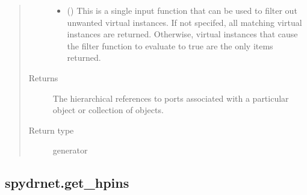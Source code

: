 \documentclass[letterpaper,10pt,english,openany,oneside]{sphinxmanual}
\begin{document}
\begin{fulllineitems}
\begin{quote}
\begin{description}
\begin{itemize}
\item {} 
 () \textendash{} This is a single input function that can be used to filter out unwanted virtual instances. If not specifed, all
matching virtual instances are returned. Otherwise, virtual instances that cause the filter function to evaluate
to true are the only items returned.

\end{itemize}

\item[{Returns}] \leavevmode
{} \textendash{} The hierarchical references to ports associated with a particular object or collection of objects.

\item[{Return type}] \leavevmode
generator

\end{description}\end{quote}

\end{fulllineitems}



\subsection{spydrnet.get\_hpins}
\label{\detokenize{reference/classes/generated/spydrnet.get_hpins:spydrnet-get-hpins}}\label{\detokenize{reference/classes/generated/spydrnet.get_hpins::doc}}
\end{document}
